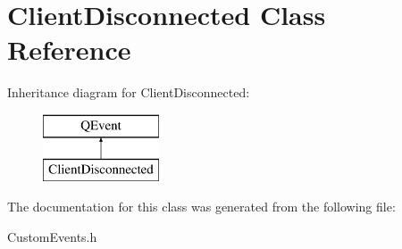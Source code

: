 \hypertarget{class_client_disconnected}{}\section{Client\+Disconnected Class Reference}
\label{class_client_disconnected}
Inheritance diagram for Client\+Disconnected\+:\begin{figure}[H]
\begin{center}
\leavevmode
\includegraphics[height=2.000000cm]{class_client_disconnected}
\end{center}
\end{figure}


The documentation for this class was generated from the following file\+:\begin{DoxyCompactItemize}
\item 
Custom\+Events.\+h\end{DoxyCompactItemize}
